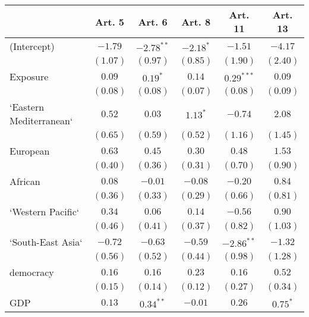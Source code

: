 
\begin{table}[!h]
\begin{center}
\begin{tabular}{l c c c c c }
\toprule
 & Art. 5 & Art. 6 & Art. 8 & Art. 11 & Art. 13 \\
\midrule
(Intercept)             & $-1.79$      & $-2.78^{**}$ & $-2.18^{*}$  & $-1.51$      & $-4.17$      \\
                        & $(1.07)$     & $(0.97)$     & $(0.85)$     & $(1.90)$     & $(2.40)$     \\
Exposure                & $0.09$       & $0.19^{*}$   & $0.14$       & $0.29^{***}$ & $0.09$       \\
                        & $(0.08)$     & $(0.08)$     & $(0.07)$     & $(0.08)$     & $(0.09)$     \\
`Eastern Mediterranean` & $0.52$       & $0.03$       & $1.13^{*}$   & $-0.74$      & $2.08$       \\
                        & $(0.65)$     & $(0.59)$     & $(0.52)$     & $(1.16)$     & $(1.45)$     \\
European                & $0.63$       & $0.45$       & $0.30$       & $0.48$       & $1.53$       \\
                        & $(0.40)$     & $(0.36)$     & $(0.31)$     & $(0.70)$     & $(0.90)$     \\
African                 & $0.08$       & $-0.01$      & $-0.08$      & $-0.20$      & $0.84$       \\
                        & $(0.36)$     & $(0.33)$     & $(0.29)$     & $(0.66)$     & $(0.81)$     \\
`Western Pacific`       & $0.34$       & $0.06$       & $0.14$       & $-0.56$      & $0.90$       \\
                        & $(0.46)$     & $(0.41)$     & $(0.37)$     & $(0.82)$     & $(1.03)$     \\
`South-East Asia`       & $-0.72$      & $-0.63$      & $-0.59$      & $-2.86^{**}$ & $-1.32$      \\
                        & $(0.56)$     & $(0.52)$     & $(0.44)$     & $(0.98)$     & $(1.28)$     \\
democracy               & $0.16$       & $0.16$       & $0.23$       & $0.16$       & $0.52$       \\
                        & $(0.15)$     & $(0.14)$     & $(0.12)$     & $(0.27)$     & $(0.34)$     \\
GDP                     & $0.13$       & $0.34^{**}$  & $-0.01$      & $0.26$       & $0.75^{*}$   \\

\end{tabular}
\end{center}
\end{table}
